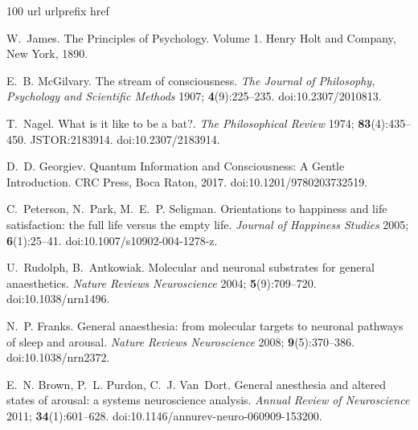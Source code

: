 \documentclass{ws-ijmpb}
\begin{document}
\begin{thebibliography}{100}
\expandafter\ifx\csname url\endcsname\relax
  \def\url#1{\texttt{#1}}\fi
\expandafter\ifx\csname urlprefix\endcsname\relax\def\urlprefix{URL }\fi
\expandafter\ifx\csname href\endcsname\relax
  \def\href#1#2{#2} \def\path#1{#1}\fi

W.~James. The Principles of Psychology. Volume 1. Henry Holt and Company, New
  York, 1890.

E.~B. McGilvary. The stream of consciousness. \emph{The Journal of Philosophy,
  Psychology and Scientific Methods} 1907; \textbf{4}(9):225--235.
\newblock \href {http://doi.org/10.2307/2010813} {\path{doi:10.2307/2010813}}.

T.~Nagel. What is it like to be a bat?. \emph{The Philosophical Review} 1974;
  \textbf{83}(4):435--450.
\newblock \href {http://jstor.org/stable/2183914} {\path{JSTOR:2183914}}. \href
  {http://doi.org/10.2307/2183914} {\path{doi:10.2307/2183914}}.

D.~D. Georgiev. Quantum Information and Consciousness: A Gentle Introduction.
  CRC Press, Boca Raton, 2017.
\newblock \href {http://doi.org/10.1201/9780203732519}
  {\path{doi:10.1201/9780203732519}}.

C.~Peterson, N.~Park, M.~E.~P. Seligman. Orientations to happiness and life
  satisfaction: the full life versus the empty life. \emph{Journal of Happiness
  Studies} 2005; \textbf{6}(1):25--41.
\newblock \href {http://doi.org/10.1007/s10902-004-1278-z}
  {\path{doi:10.1007/s10902-004-1278-z}}.

U.~Rudolph, B.~Antkowiak. Molecular and neuronal substrates for general
  anaesthetics. \emph{Nature Reviews Neuroscience} 2004;
  \textbf{5}(9):709--720.
\newblock \href {http://doi.org/10.1038/nrn1496} {\path{doi:10.1038/nrn1496}}.

N.~P. Franks. General anaesthesia: from molecular targets to neuronal pathways
  of sleep and arousal. \emph{Nature Reviews Neuroscience} 2008;
  \textbf{9}(5):370--386.
\newblock \href {http://doi.org/10.1038/nrn2372} {\path{doi:10.1038/nrn2372}}.

E.~N. Brown, P.~L. Purdon, C.~J. Van~Dort. General anesthesia and altered
  states of arousal: a systems neuroscience analysis. \emph{Annual Review of
  Neuroscience} 2011; \textbf{34}(1):601--628.
\newblock \href {http://doi.org/10.1146/annurev-neuro-060909-153200}
  {\path{doi:10.1146/annurev-neuro-060909-153200}}.


\end{thebibliography}
\end{document}
